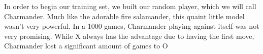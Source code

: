 
In order to begin our training set, we built our random player, which we will call Charmander.
Much like the adorable fire salamander, this quaint little model wasn't very powerful.
In a 1000 games, Charmander playing against itself was not very promising.
While X always has the advantage due to having the first move, Charmander lost a significant amount of games to O
